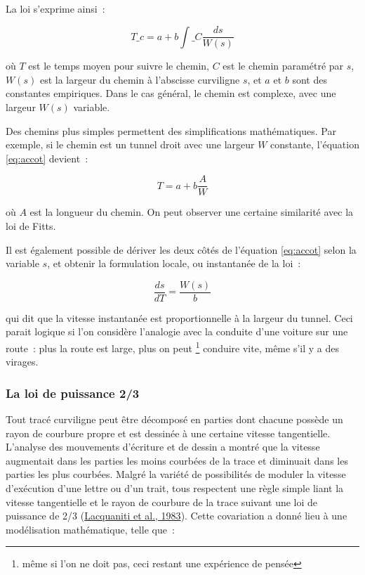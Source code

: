 \documentclass[
]{book}
\begin{document}
La loi s'exprime ainsi~:

\begin{equation}
 T\_{c}=a+b\int\_{C}\frac{ds}{W(s)}
 \label{eq:accot}
\end{equation}

où \(T\) est le temps moyen pour suivre le chemin,
\(C\) est le chemin paramétré par \(s\), \(W(s)\) est la largeur du chemin à
l'abscisse curviligne \(s\), et \(a\) et \(b\) sont des constantes empiriques.
Dans le cas général, le chemin est complexe, avec une largeur \(W(s)\) variable.

Des chemins plus simples permettent des simplifications mathématiques. Par
exemple, si le chemin est un tunnel droit avec une largeur \(W\) constante,
l'équation \eqref{eq:accot} devient~:

\[
 T=a+b\frac{A}{W}\]

où \(A\) est la longueur du chemin. On peut
observer une certaine similarité avec la loi de Fitts.

Il est également possible de dériver les deux côtés de l'équation
\eqref{eq:accot} selon la variable \(s\), et obtenir
la formulation locale, ou instantanée de la loi~:

\[
 \frac{ds}{dT}=\frac{W(s)}{b}\]

qui dit que la vitesse instantanée est proportionnelle à la largeur du
tunnel. Ceci parait logique si l'on considère l'analogie avec la conduite
d'une voiture sur une route~: plus la route est large, plus on peut
\footnote{même si l'on ne doit pas, ceci restant une expérience de pensée}
conduire vite, même s'il y a des virages.

\hypertarget{la-loi-de-puissance-23}{%
\subsubsection{La loi de puissance 2/3}\label{la-loi-de-puissance-23}}

Tout tracé curviligne peut être décomposé en parties dont chacune possède
un rayon de courbure propre et est dessinée à une certaine vitesse
tangentielle. L'analyse des mouvements d'écriture et de dessin a montré que
la vitesse augmentait dans les parties les moins courbées de la trace et
diminuait dans les parties les plus courbées. Malgré la variété de
possibilités de moduler la vitesse d'exécution d'une lettre ou d'un trait,
tous respectent une règle simple liant la vitesse tangentielle et le rayon de
courbure de la trace suivant une loi de puissance de 2/3 (\protect\hyperlink{ref-lacquaniti1983law}{Lacquaniti et al., 1983}). Cette
covariation a donné lieu à une modélisation mathématique, telle que~:
\end{document}
